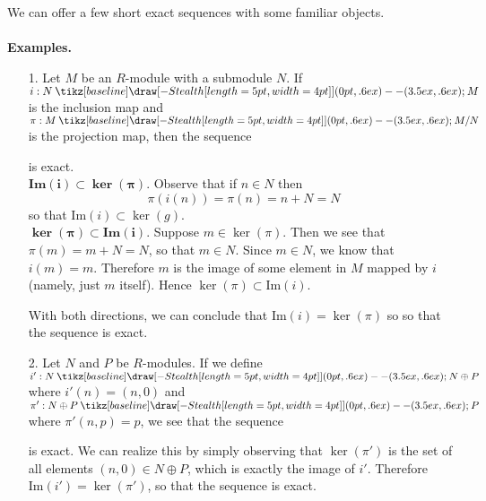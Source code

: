 \documentclass[12pt,letterpaper]{algebra_book}
\newcommand{\smallish}{1.45em} %
\renewcommand{\to}{\mathbin{\tikz[baseline] \draw[-{Stealth[length=5pt,width=4pt]}] (0pt,.6ex) -- (3.5ex,.6ex);}}
\newcommand{\im}{\mbox{Im}}
\theoremstyle{definition}
\begin{document}
We can offer a few short exact sequences with some familiar
objects. 
\\
\\
\textbf{Examples.}
\begin{itemize}
    \item[1.] Let $M$ be an $R$-module with a submodule $N$. If
    $i:N \to M$ is the inclusion map and 
    $\pi: M \to M/N$ is the projection map, then the sequence 
\begin{center}
\end{center}
is exact. \\
$\bm{\im(i) \subset \ker(\pi)}$. Observe
    that if $n \in N$ then 
    \[ 
        \pi(i(n)) = \pi(n) = n + N = N
    \]
    so that $\im(i) \subset \ker(g)$.
\\
$\bm{\ker(\pi) \subset \im(i)}$. Suppose $m
    \in \ker(\pi)$. Then we see that $\pi(m) = m + N = N$, so that
    $m \in N$. Since $m \in N$, we know that $i(m) = m$. Therefore
    $m$ is the image of some element in $M$ mapped by $i$ (namely,
    just $m$ itself). Hence $\ker(\pi) \subset \im(i)$.

With both directions, we can conclude that $\im(i) = \ker(\pi)$ so
so that the sequence is exact.

    \item[2.] Let $N$ and $P$ be $R$-modules. If we define $i':N
    \to N \oplus P$ where $i'(n) = (n, 0)$ and $\pi': N \oplus P
    \to P$ where $\pi'(n, p) = p$, we see that the sequence
    \begin{center} 
    \end{center}
    is exact. We can realize this by simply observing that
    $\ker(\pi')$ is the set of all elements $(n, 0) \in N \oplus
    P$, which is exactly the image of $i'$. Therefore $\im(i') =
    \ker(\pi')$, so that the sequence is exact.


\end{itemize}
\end{document}

